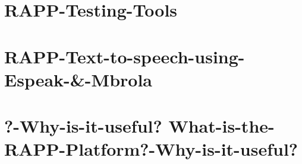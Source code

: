 \documentclass[twoside]{book}
\begin{document}
\chapter{R\-A\-P\-P-\/\-Testing-\/\-Tools}
\label{md_rapp-platform_8wiki_RAPP-Testing-Tools}
\hypertarget{md_rapp-platform_8wiki_RAPP-Testing-Tools}{}

\chapter{R\-A\-P\-P-\/\-Text-\/to-\/speech-\/using-\/\-Espeak-\/\&-\/\-Mbrola}
\label{md_rapp-platform_8wiki_RAPP-Text-to-speech-using-Espeak-_6-Mbrola}
\hypertarget{md_rapp-platform_8wiki_RAPP-Text-to-speech-using-Espeak-_6-Mbrola}{}

\chapter{?-\/\-Why-\/is-\/it-\/useful? What-\/is-\/the-\/\-R\-A\-P\-P-\/\-Platform?-\/\-Why-\/is-\/it-\/useful?}
\label{md_rapp-platform_8wiki_What-is-the-RAPP-Platform}
\hypertarget{md_rapp-platform_8wiki_What-is-the-RAPP-Platform}{}


\newpage
{}
{}
\printindex
\end{document}
